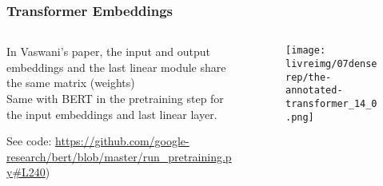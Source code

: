 \begin{frame}[fragile]
\frametitle{Transformer Embeddings}\color{structure}
\begin{columns}
\begin{column}[c]{0.62\textwidth}

In Vaswani's paper, the input and output embeddings and the last linear module share the same matrix (weights)\\
Same with BERT in the pretraining step for the input embeddings and last linear layer.

See code: \url{https://github.com/google-research/bert/blob/master/run_pretraining.py#L240})
\end{column}
\begin{column}[c]{0.4\textwidth}
\begin{figure}[tb]
\begin{center}
 \texttt{[image: \\livreimg/07denserep/the-annotated-transformer\_14\_0.png]}
\end{center}
\end{figure}
\end{column}
\end{columns}
\end{frame}



